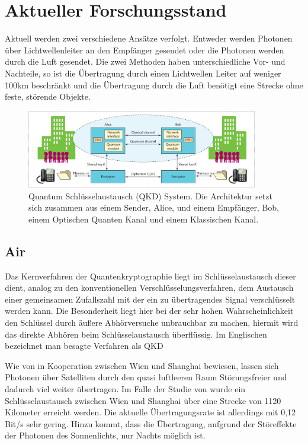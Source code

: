 \chapter{Aktueller Forschungsstand}\label{forschungsstand}

Aktuell werden zwei verschiedene Ansätze verfolgt.
Entweder werden Photonen über Lichtwellenleiter an den Empfänger gesendet oder die Photonen werden durch die Luft gesendet.
Die zwei Methoden haben unterschiedliche Vor- und Nachteile, so ist die Übertragung durch einen Lichtwellen Leiter auf weniger 100km beschränkt und die Übertragung durch die Luft benötigt eine Strecke ohne feste, störende Objekte.

\begin{figure}[htbp] 
  \centering
     \includegraphics[width=0.9\textwidth]{img/qkd.jpg}
     \caption{Quantum Schlüsselaustausch (QKD) System. Die Architektur setzt sich zusammen aus einem Sender, Alice, und einem Empfänger, Bob, einem Optischen Quanten Kanal und einem Klassischen Kanal.}
  \label{fig:Bild1}
\end{figure}
\section{Air}
Das Kernverfahren der Quantenkryptographie liegt im Schlüsselaustausch
dieser dient, analog zu den konventionellen Verschlüsselungsverfahren, dem Austausch einer gemeinsamen Zufallszahl mit der ein zu übertragendes Signal verschlüsselt werden kann. Die Besonderheit liegt hier bei der sehr hohen Wahrscheinlichkeit den Schlüssel durch äußere Abhörversuche unbrauchbar zu machen, hiermit wird das direkte Abhören beim Schlüsselaustausch überflüssig. Im Englischen bezeichnet man besagte Verfahren als \ac{QKD}

Wie von \cite{Ren_2017} in Kooperation zwischen Wien und Shanghai bewiesen, lassen sich Photonen über Satelliten durch den quasi luftleeren Raum Störungsfreier und dadurch viel weiter übertragen. Im Falle der Studie von \cite{Ren_2017} wurde ein Schlüsselaustausch zwischen Wien und Shanghai über eine Strecke von 1120 Kilometer erreicht werden. Die aktuelle Übertragungsrate ist allerdings mit 0,12 Bit/s sehr gering. Hinzu kommt, dass die Übertragung, aufgrund der Störeffekte der Photonen des Sonnenlichts, nur Nachts möglich ist.

